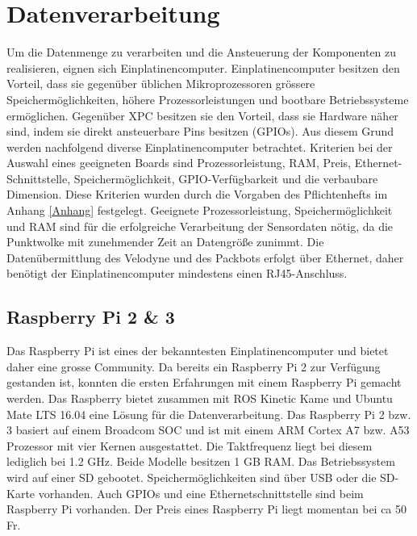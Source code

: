 \section{Datenverarbeitung}
\label{sec:Datenverarbeitung}
Um die Datenmenge zu verarbeiten und die Ansteuerung der Komponenten zu realisieren, eignen sich Einplatinencomputer. Einplatinencomputer besitzen den Vorteil, dass sie gegenüber üblichen Mikroprozessoren grössere Speichermöglichkeiten, höhere Prozessorleistungen und bootbare Betriebssysteme ermöglichen. Gegenüber \ac{XPC} besitzen sie den Vorteil, dass sie Hardware näher sind, indem sie direkt ansteuerbare Pins besitzen (GPIOs). Aus diesem Grund werden nachfolgend diverse Einplatinencomputer betrachtet. Kriterien bei der Auswahl eines geeigneten Boards sind Prozessorleistung, \ac{RAM}, Preis, Ethernet-Schnittstelle, Speichermöglichkeit, GPIO-Verfügbarkeit und die verbaubare Dimension. Diese Kriterien wurden durch die Vorgaben des Pflichtenhefts im Anhang \ref{Anhang} festgelegt. Geeignete Prozessorleistung, Speichermöglichkeit und \ac{RAM} sind für die erfolgreiche Verarbeitung der Sensordaten nötig, da die Punktwolke mit zunehmender Zeit an Datengröße zunimmt. Die Datenübermittlung des Velodyne und des Packbots erfolgt über Ethernet, daher benötigt der Einplatinencomputer mindestens einen RJ45-Anschluss.

\subsection{Raspberry Pi 2 \& 3}
\label{subsec:Raspberry}
Das Raspberry Pi ist eines der bekanntesten Einplatinencomputer und bietet daher eine grosse Community. Da bereits ein Raspberry Pi 2 zur Verfügung gestanden ist, konnten die ersten Erfahrungen mit einem Raspberry Pi gemacht werden. Das Raspberry bietet zusammen mit ROS Kinetic Kame und Ubuntu Mate LTS 16.04 eine Lösung für die Datenverarbeitung. Das Raspberry Pi 2 bzw. 3 basiert auf einem Broadcom \ac{SOC} und ist mit einem \ac{ARM} Cortex A7 bzw. A53 Prozessor mit vier Kernen ausgestattet. Die Taktfrequenz liegt bei diesem lediglich bei 1.2 GHz. Beide Modelle besitzen 1 GB \ac{RAM}. Das Betriebssystem wird auf einer \ac{SD} gebootet. Speichermöglichkeiten sind über USB oder die SD-Karte vorhanden. Auch GPIOs und eine Ethernetschnittstelle sind beim Raspberry Pi vorhanden. Der Preis eines Raspberry Pi liegt momentan bei ca 50 Fr. \cite{rpi}

